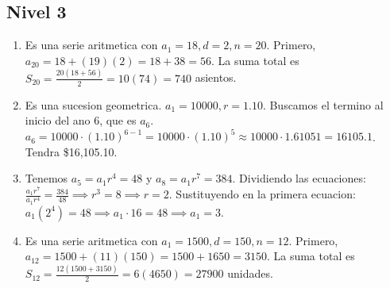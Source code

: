 \documentclass[12pt,a4paper]{article}
\begin{document}
\subsection*{Nivel 3}
\begin{enumerate}
    \item Es una serie aritmetica con $a_1=18, d=2, n=20$. Primero, $a_{20} = 18 + (19)(2) = 18+38=56$. La suma total es $S_{20} = \frac{20(18+56)}{2} = 10(74) = 740$ asientos.
    \item Es una sucesion geometrica. $a_1 = 10000, r=1.10$. Buscamos el termino al inicio del ano 6, que es $a_6$. $a_6 = 10000 \cdot (1.10)^{6-1} = 10000 \cdot (1.10)^5 \approx 10000 \cdot 1.61051 = 16105.1$. Tendra \$16,105.10.
    \item Tenemos $a_5 = a_1 r^4 = 48$ y $a_8 = a_1 r^7 = 384$. Dividiendo las ecuaciones: $\frac{a_1 r^7}{a_1 r^4} = \frac{384}{48} \implies r^3 = 8 \implies r=2$. Sustituyendo en la primera ecuacion: $a_1 (2^4) = 48 \implies a_1 \cdot 16 = 48 \implies a_1=3$.
    \item Es una serie aritmetica con $a_1=1500, d=150, n=12$. Primero, $a_{12} = 1500 + (11)(150) = 1500 + 1650 = 3150$. La suma total es $S_{12} = \frac{12(1500+3150)}{2} = 6(4650) = 27900$ unidades.
\end{enumerate}
\end{document}
